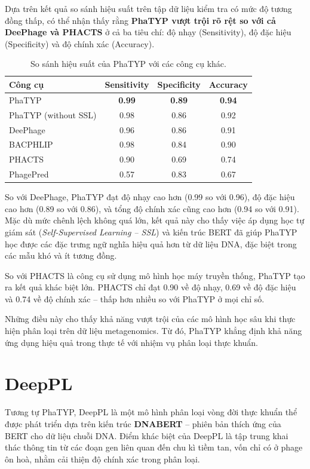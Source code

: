 Dựa trên kết quả so sánh hiệu suất trên tập dữ liệu kiểm tra có mức độ tương đồng thấp, có thể nhận thấy rằng \textbf{PhaTYP vượt trội rõ rệt so với cả DeePhage và PHACTS} ở cả ba tiêu chí: độ nhạy (Sensitivity), độ đặc hiệu (Specificity) và độ chính xác (Accuracy).

\begin{table}[ht]
\centering
\caption{So sánh hiệu suất của PhaTYP với các công cụ khác.}
\label{tab:PhaTPY_Result}
\begin{tabular}{|l|c|c|c|}
\hline
\textbf{Công cụ} & \textbf{Sensitivity} & \textbf{Specificity} & \textbf{Accuracy} \\
\hline
PhaTYP             & \textbf{0.99} & \textbf{0.89} & \textbf{0.94} \\
PhaTYP (without SSL)   & 0.98 & 0.86 & 0.92 \\
DeePhage           & 0.96 & 0.86 & 0.91 \\
BACPHLIP           & 0.98 & 0.84 & 0.90 \\
PHACTS             & 0.90 & 0.69 & 0.74 \\
PhagePred          & 0.57 & 0.83 & 0.67 \\
\hline
\end{tabular}
\end{table}

So với DeePhage, PhaTYP đạt độ nhạy cao hơn (0.99 so với 0.96), độ đặc hiệu cao hơn (0.89 so với 0.86), và tổng độ chính xác cũng cao hơn (0.94 so với 0.91). Mặc dù mức chênh lệch không quá lớn, kết quả này cho thấy việc áp dụng học tự giám sát (\textit{Self-Supervised Learning – SSL}) và kiến trúc BERT đã giúp PhaTYP học được các đặc trưng ngữ nghĩa hiệu quả hơn từ dữ liệu DNA, đặc biệt trong các mẫu khó và ít tương đồng.

So với PHACTS là công cụ sử dụng mô hình học máy truyền thống, PhaTYP tạo ra kết quả khác biệt lớn. PHACTS chỉ đạt 0.90 về độ nhạy, 0.69 về độ đặc hiệu và 0.74 về độ chính xác – thấp hơn nhiều so với PhaTYP ở mọi chỉ số. 

Những điều này cho thấy khả năng vượt trội của các mô hình học sâu khi thực hiện phân loại trên dữ liệu metagenomics. Từ đó, PhaTYP khẳng định khả năng ứng dụng hiệu quả trong thực tế với nhiệm vụ phân loại thực khuẩn.

\section{DeepPL}
Tương tự PhaTYP, DeepPL\cite{zhang2024deeppl} là một mô hình phân loại vòng đời thực khuẩn thể được phát triển dựa trên kiến trúc \textbf{DNABERT} – phiên bản thích ứng của BERT cho dữ liệu chuỗi DNA. Điểm khác biệt của DeepPL là tập trung khai thác thông tin từ các đoạn gen liên quan đến chu kì tiềm tan, vốn chỉ có ở phage ôn hoà, nhằm cải thiện độ chính xác trong phân loại.

